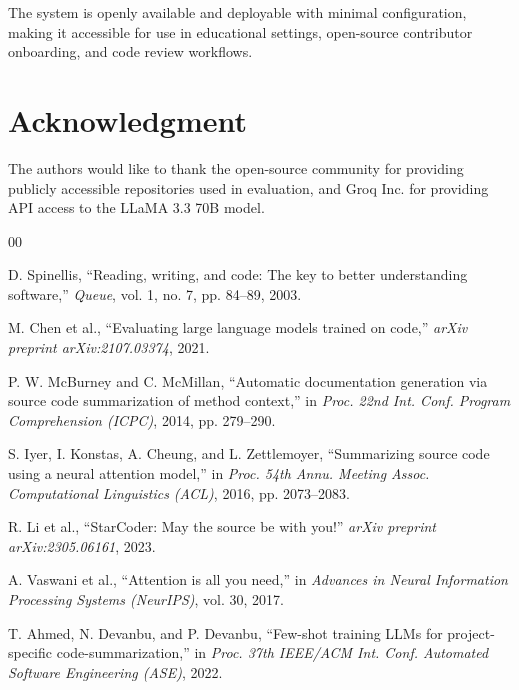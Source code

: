 \documentclass[conference]{IEEEtran}
\begin{document}
The system is openly available and deployable with minimal configuration, making it accessible for use in educational settings, open-source contributor onboarding, and code review workflows.

\section*{Acknowledgment}

The authors would like to thank the open-source community for providing publicly accessible repositories used in evaluation, and Groq Inc. for providing API access to the LLaMA 3.3 70B model.

\begin{thebibliography}{00}

D. Spinellis, ``Reading, writing, and code: The key to better understanding software,''
\textit{Queue}, vol. 1, no. 7, pp. 84--89, 2003.

M. Chen et al., ``Evaluating large language models trained on code,''
\textit{arXiv preprint arXiv:2107.03374}, 2021.

P. W. McBurney and C. McMillan, ``Automatic documentation generation via source code summarization of method context,''
in \textit{Proc. 22nd Int. Conf. Program Comprehension (ICPC)}, 2014, pp. 279--290.

S. Iyer, I. Konstas, A. Cheung, and L. Zettlemoyer, ``Summarizing source code using a neural attention model,''
in \textit{Proc. 54th Annu. Meeting Assoc. Computational Linguistics (ACL)}, 2016, pp. 2073--2083.

R. Li et al., ``StarCoder: May the source be with you!''
\textit{arXiv preprint arXiv:2305.06161}, 2023.

A. Vaswani et al., ``Attention is all you need,''
in \textit{Advances in Neural Information Processing Systems (NeurIPS)}, vol. 30, 2017.

T. Ahmed, N. Devanbu, and P. Devanbu, ``Few-shot training LLMs for project-specific code-summarization,''
in \textit{Proc. 37th IEEE/ACM Int. Conf. Automated Software Engineering (ASE)}, 2022.

\end{thebibliography}
\end{document}
